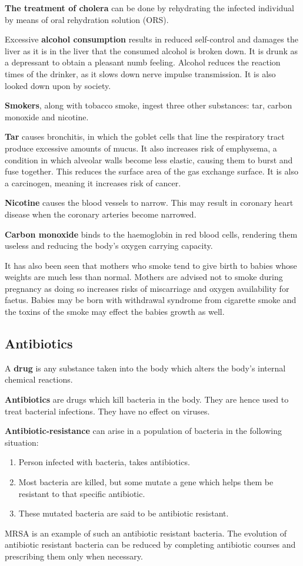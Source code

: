 \textbf{The treatment of cholera} can be done by rehydrating the infected individual by means of
oral rehydration solution (ORS). 

Excessive \textbf{alcohol consumption} results in reduced self-control and damages the liver as it
is in the liver that the consumed alcohol is broken down. It is drunk as a depressant to obtain
a pleasant numb feeling. Alcohol reduces the reaction times of the drinker, as it slows down nerve
impulse transmission. It is also looked down upon by society.

\textbf{Smokers}, along with tobacco smoke, ingest three other substances: tar, carbon monoxide and
nicotine.

\textbf{Tar} causes bronchitis, in which the goblet cells that line the respiratory tract produce
excessive amounts of mucus. It also increases risk of emphysema, a condition in which alveolar
walls become less elastic, causing them to burst and fuse together. This reduces the surface area
of the gas exchange surface. It is also a carcinogen, meaning it increases risk of cancer.

\textbf{Nicotine} causes the blood vessels to narrow. This may result in coronary heart disease
when the coronary arteries become narrowed.

\textbf{Carbon monoxide} binds to the haemoglobin in red blood cells, rendering them useless and
reducing the body's oxygen carrying capacity. 

It has also been seen that mothers who smoke tend to give birth to babies whose weights are much
less than normal. Mothers are advised not to smoke during pregnancy as doing so increases risks
of miscarriage and oxygen availability for faetus. Babies may be born with withdrawal syndrome
from cigarette smoke and the toxins of the smoke may effect the babies growth as well.

\subsection{Antibiotics}
A \textbf{drug} is any substance taken into the body which alters the body's internal chemical
reactions. 

\textbf{Antibiotics} are drugs which kill bacteria in the body. They are hence used to treat 
bacterial infections. They have no effect on viruses.

\textbf{Antibiotic-resistance} can arise in a population of bacteria in the following situation:
\begin{enumerate}
	\item Person infected with bacteria, takes antibiotics.
	\item Most bacteria are killed, but some mutate a gene which helps them be resistant to 
		that specific antibiotic.
	\item These mutated bacteria are said to be antibiotic resistant.
\end{enumerate}
MRSA is an example of such an antibiotic resistant bacteria. The evolution of antibiotic resistant
bacteria can be reduced by completing antibiotic courses and prescribing them only when necessary.

